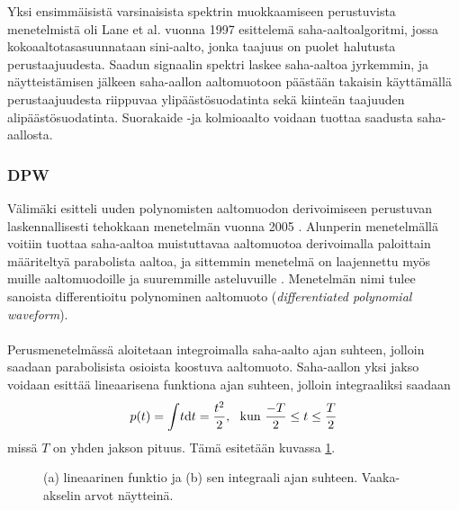 \documentclass[finnish,12pt,a4paper,pdftex]{article} %
\begin{document}
Yksi ensimmäisistä varsinaisista spektrin muokkaamiseen perustuvista menetelmistä oli Lane et al. vuonna 1997 esittelemä saha-aaltoalgoritmi, jossa kokoaaltotasasuunnataan sini-aalto, jonka taajuus on puolet halutusta perustaajuudesta. Saadun signaalin spektri laskee saha-aaltoa jyrkemmin, ja näytteistämisen jälkeen saha-aallon aaltomuotoon päästään takaisin käyttämällä perustaajuudesta riippuvaa ylipäästösuodatinta sekä kiinteän taajuuden alipäästösuodatinta. Suorakaide -ja kolmioaalto voidaan tuottaa saadusta saha-aallosta. \cite{Pekonen2014, Valimaki2005}    

\subsubsection{DPW}

Välimäki esitteli uuden polynomisten aaltomuodon derivoimiseen perustuvan laskennallisesti tehokkaan menetelmän vuonna 2005 \cite{Valimaki2005}. Alunperin menetelmällä voitiin tuottaa saha-aaltoa muistuttavaa aaltomuotoa derivoimalla paloittain määriteltyä parabolista aaltoa, ja sittemmin menetelmä on laajennettu myös muille aaltomuodoille ja suuremmille asteluvuille \cite{Valimaki2006, Valimaki2010}. Menetelmän nimi tulee sanoista differentioitu polynominen aaltomuoto (\textit{differentiated polynomial waveform}). \\\\ 
Perusmenetelmässä aloitetaan integroimalla saha-aalto ajan suhteen, jolloin saadaan parabolisista osioista koostuva aaltomuoto. Saha-aallon yksi jakso voidaan esittää lineaarisena funktiona ajan suhteen, jolloin integraaliksi saadaan \vspace{1mm}
\begin{equation}
\label{eq:integraali}
p(t) = \int \! t \mathrm{d}t = \frac{t^2}{2}, \ \ \text{kun} \ \frac{-T}{2} \leq t \leq \frac{T}{2} \vspace{1mm}
\end{equation}
missä $T$ on yhden jakson pituus. Tämä esitetään kuvassa \ref{fig:dpw}. \cite{Valimaki2005}
\vspace{2mm}
\begin{figure}[ht] 
\begin{center} 	
\caption{(a) lineaarinen funktio ja (b) sen integraali ajan suhteen. Vaaka-akselin arvot näytteinä.}
\label{fig:dpw}
\end{center}
\end{figure} \\
\end{document}
